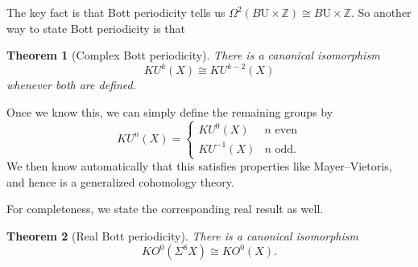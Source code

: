 \documentclass{shortart}
\newtheorem{thm}{Theorem}
\theoremstyle{definition}
\newcommand\BU{B\mathrm{U}}
\newcommand\Z{\mathbb{Z}}
\begin{document}
The key fact is that Bott periodicity tells us $\Omega^2 (\BU \times \Z) \cong \BU \times \Z$. So another way to state Bott periodicity is that
\begin{thm}[Complex Bott periodicity]
  There is a canonical isomorphism
  \[
    KU^k(X) \cong KU^{k - 2}(X)
  \]
  whenever both are defined.
\end{thm}

Once we know this, we can simply define the remaining groups by
\[
  KU^n(X) =
  \begin{cases}
    KU^0(X) & n\text{ even}\\
    KU^{-1}(X) & n\text{ odd}.
  \end{cases}
\]
We then know automatically that this satisfies properties like Mayer--Vietoris, and hence is a generalized cohomology theory.

For completeness, we state the corresponding real result as well.
\begin{thm}[Real Bott periodicity]
  There is a canonical isomorphism
  \[
    KO^0(\Sigma^8 X) \cong KO^0(X).
  \]
\end{thm}
\end{document}
